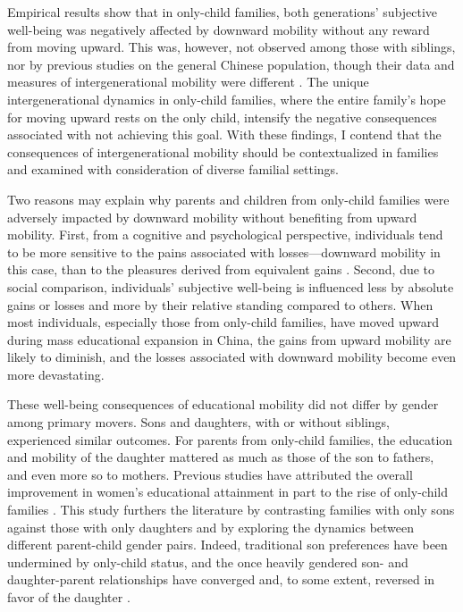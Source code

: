 Empirical results show that in only-child families, both generations' subjective well-being was negatively affected by downward mobility without any reward from moving upward. This was, however, not observed among those with siblings, nor by previous studies on the general Chinese population, though their data and measures of intergenerational mobility were different \parencite{zangFrustratedAchieversSatisfied2016,zhaoDifferentialAcculturationStudy2019,zhaoInterIntragenerationalSocial2017}. The unique intergenerational dynamics in only-child families, where the entire family's hope for moving upward rests on the only child, intensify the negative consequences associated with not achieving this goal. With these findings, I contend that the consequences of intergenerational mobility should be contextualized in families and examined with consideration of diverse familial settings.

Two reasons may explain why parents and children from only-child families were adversely impacted by downward mobility without benefiting from upward mobility. First, from a cognitive and psychological perspective, individuals tend to be more sensitive to the pains associated with losses—downward mobility in this case, than to the pleasures derived from equivalent gains \parencite{kahnemanAnomaliesEndowmentEffect1991}. Second, due to social comparison, individuals’ subjective well-being is influenced less by absolute gains or losses and more by their relative standing compared to others. When most individuals, especially those from only-child families, have moved upward during mass educational expansion in China, the gains from upward mobility are likely to diminish, and the losses associated with downward mobility become even more devastating.

These well-being consequences of educational mobility did not differ by gender among primary movers. Sons and daughters, with or without siblings, experienced similar outcomes. For parents from only-child families, the education and mobility of the daughter mattered as much as those of the son to fathers, and even more so to mothers. Previous studies have attributed the overall improvement in women's educational attainment in part to the rise of only-child families \parencite{fongChinasOneChildPolicy2002,wuFertilityDeclineWomens2014}. This study furthers the literature by contrasting families with only sons against those with only daughters and by exploring the dynamics between different parent-child gender pairs. Indeed, traditional son preferences have been undermined by only-child status, and the once heavily gendered son- and daughter-parent relationships have converged and, to some extent, reversed in favor of the daughter \parencite{guWhyChineseAdolescent2021}.

